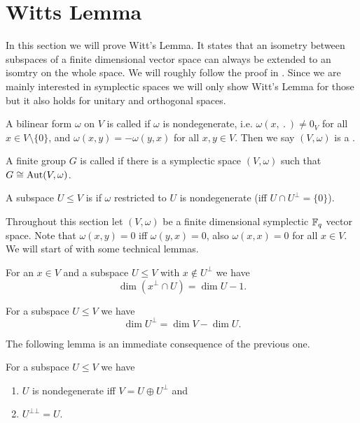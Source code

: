 \section{Witts Lemma}
In this section we will prove Witt's Lemma. It states that an isometry between subspaces of a finite dimensional vector space can always be extended to an isomtry on the whole space.  We will roughly follow the proof in \cite{Witt}. Since we are mainly interested in symplectic spaces we will only show Witt's Lemma for those but it also holds for unitary and orthogonal spaces.

\begin{definition}
A bilinear form $\omega$ on $V$ is called  if $\omega$ is nondegenerate, i.e. $\omega(x,\ .\ )\not=0_V$ for all $x\in V\setminus\{0\}$, and $\omega(x,y)=-\omega(y,x)$ for all $x,y\in V$. Then we say $(V,\omega)$ is a .

A finite group $G$ is called  if there is a symplectic space $(V,\omega)$ such that $G\cong\operatorname{Aut}(V,\omega)$. 

A subspace $U\leq V$ is  if $\omega$ restricted to $U$ is nondegenerate (iff $U\cap U^\bot=\{0\}$). 

\end{definition}
Throughout this section let $(V,\omega)$ be a finite dimensional symplectic $\mathbb{F}_q$ vector space.
Note that $\omega(x,y)=0$ iff $\omega(y,x)=0$, also $\omega(x,x)=0$ for all $x\in V$.
We will start of with some technical lemmas.


\begin{lemma}
For an $x\in V$ and a subspace $U\leq V$ with $x\notin U^\bot$ we have 
\[\dim( x^\bot\cap U)= \dim U -1.\]
\end{lemma}

\begin{lemma}
For a subspace $U\leq V$ we have 
\[\dim U^\bot= \dim V -\dim U.\]
\end{lemma}

The following lemma is an immediate consequence of the previous one.
\begin{lemma}
For a subspace $U\leq V$ we have 
\begin{enumerate}
\item $U$ is nondegenerate iff $V=U\oplus U^\bot$ and
\item $U^{\bot\bot}=U$.
\end{enumerate}
\end{lemma}

